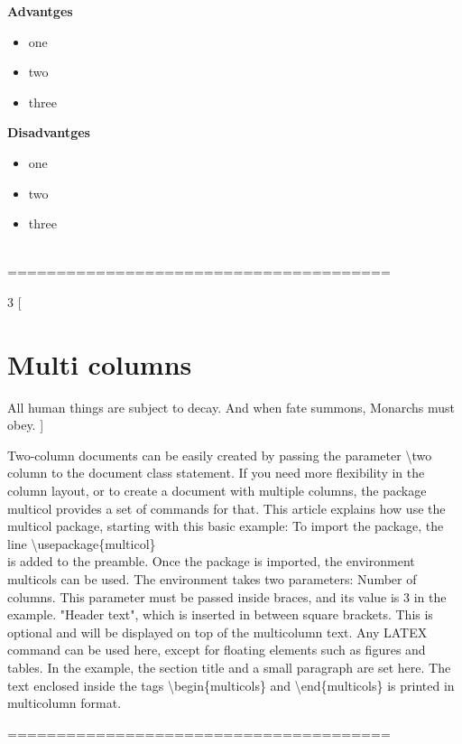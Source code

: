 \documentclass{article}
\begin{document}
	
	
	\begin{minipage}{0.5\linewidth}
		\textbf{Advantges}		
		\begin{itemize}
			\item one
			\item two
			\item three
		\end{itemize}	
	\end{minipage}	
	\begin{minipage}{0.5\linewidth}
		\textbf{Disadvantges}	
		\begin{itemize}
			\item one
			\item two
			\item three
		\end{itemize}	
	\end{minipage}
	\\
	
	=======================================	
	
	\begin{multicols}{3}
		[
		\section{Multi columns}	
		All human things are subject to decay. And when fate summons, Monarchs must obey.	
		]
		
		Two-column documents can be easily created by passing the parameter \textbackslash two column to the document class statement. If you need more flexibility in the column layout, or to create a document with multiple columns, the package multicol provides a set of commands for that. This article explains how use the multicol package, starting with this basic example:
		To import the package, the line
		\textbackslash usepackage\{multicol\}\\
		is added to the preamble. Once the package is imported, the environment multicols can be used. The environment takes two parameters:
		Number of columns. This parameter must be passed inside braces, and its value is 3 in the example.
		"Header text", which is inserted in between square brackets. This is optional and will be displayed on top of the multicolumn text. Any LATEX command can be used here, except for floating elements such as figures and tables. In the example, the section title and a small paragraph are set here.
		The text enclosed inside the tags \textbackslash begin\{multicols\} and \textbackslash end\{multicols\} is printed in multicolumn format.
	\end{multicols}
	=======================================	
	
\end{document}
